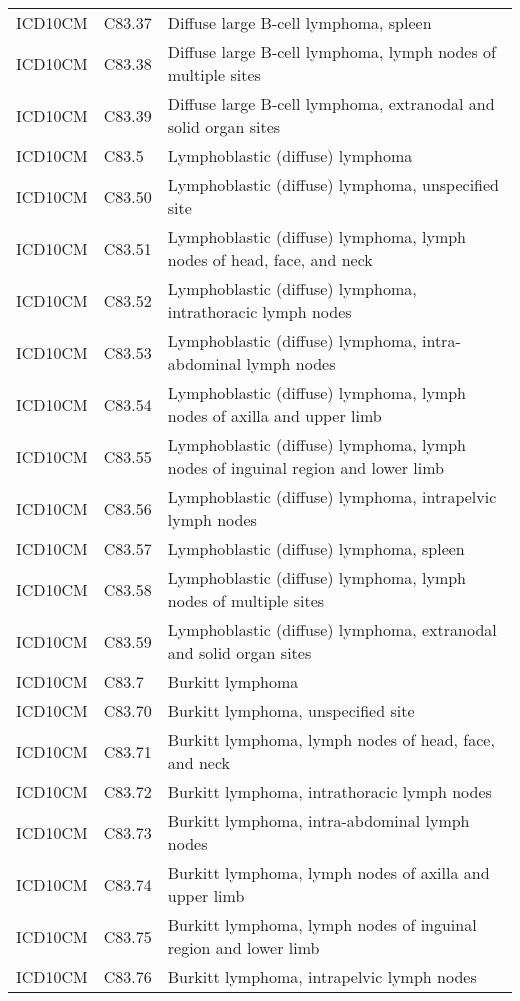\begin{longtable}{p{}p{}p{}}
  ICD10CM & C83.37 & Diffuse large B-cell lymphoma, spleen \\ 
  ICD10CM & C83.38 & Diffuse large B-cell lymphoma, lymph nodes of multiple sites \\ 
  ICD10CM & C83.39 & Diffuse large B-cell lymphoma, extranodal and solid organ sites \\ 
  ICD10CM & C83.5 & Lymphoblastic (diffuse) lymphoma \\ 
  ICD10CM & C83.50 & Lymphoblastic (diffuse) lymphoma, unspecified site \\ 
  ICD10CM & C83.51 & Lymphoblastic (diffuse) lymphoma, lymph nodes of head, face, and neck \\ 
  ICD10CM & C83.52 & Lymphoblastic (diffuse) lymphoma, intrathoracic lymph nodes \\ 
  ICD10CM & C83.53 & Lymphoblastic (diffuse) lymphoma, intra-abdominal lymph nodes \\ 
  ICD10CM & C83.54 & Lymphoblastic (diffuse) lymphoma, lymph nodes of axilla and upper limb \\ 
  ICD10CM & C83.55 & Lymphoblastic (diffuse) lymphoma, lymph nodes of inguinal region and lower limb \\ 
  ICD10CM & C83.56 & Lymphoblastic (diffuse) lymphoma, intrapelvic lymph nodes \\ 
  ICD10CM & C83.57 & Lymphoblastic (diffuse) lymphoma, spleen \\ 
  ICD10CM & C83.58 & Lymphoblastic (diffuse) lymphoma, lymph nodes of multiple sites \\ 
  ICD10CM & C83.59 & Lymphoblastic (diffuse) lymphoma, extranodal and solid organ sites \\ 
  ICD10CM & C83.7 & Burkitt lymphoma \\ 
  ICD10CM & C83.70 & Burkitt lymphoma, unspecified site \\ 
  ICD10CM & C83.71 & Burkitt lymphoma, lymph nodes of head, face, and neck \\ 
  ICD10CM & C83.72 & Burkitt lymphoma, intrathoracic lymph nodes \\ 
  ICD10CM & C83.73 & Burkitt lymphoma, intra-abdominal lymph nodes \\ 
  ICD10CM & C83.74 & Burkitt lymphoma, lymph nodes of axilla and upper limb \\ 
  ICD10CM & C83.75 & Burkitt lymphoma, lymph nodes of inguinal region and lower limb \\ 
  ICD10CM & C83.76 & Burkitt lymphoma, intrapelvic lymph nodes \\ 

\end{longtable}
